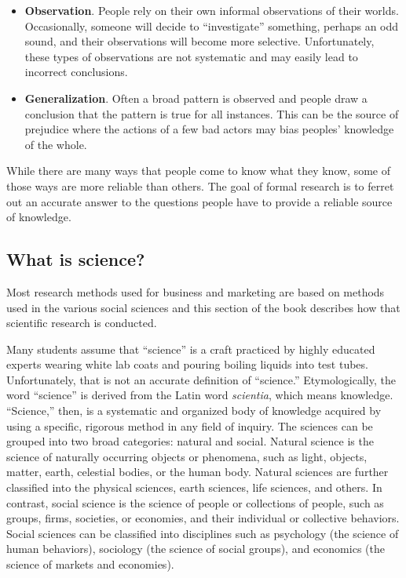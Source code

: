 \begin{itemize}
	\item \textbf{Observation}. People rely on their own informal observations of their worlds. Occasionally, someone will decide to ``investigate'' something, perhaps an odd sound, and their observations will become more selective. Unfortunately, these types of observations are not systematic and may easily lead to incorrect conclusions.
	
	\item \textbf{Generalization}. Often a broad pattern is observed and people draw a conclusion that the pattern is true for all instances. This can be the source of prejudice where the actions of a few bad actors may bias peoples' knowledge of the whole.
	
\end{itemize} 

While there are many ways that people come to know what they know, some of those ways are more reliable than others. The goal of formal research is to ferret out an accurate answer to the questions people have \textemdash \; to provide a reliable source of knowledge. 

\subsection{What is science?}

Most research methods used for business and marketing are based on methods used in the various social sciences and this section of the book describes how that scientific research is conducted.

Many students assume that ``science'' is a craft practiced by highly educated experts wearing white lab coats and pouring boiling liquids into test tubes. Unfortunately, that is not an accurate definition of ``science.'' Etymologically, the word ``science'' is derived from the Latin word \textit{scientia}, which means knowledge. ``Science,'' then, is a systematic and organized body of knowledge acquired by using a specific, rigorous method in any field of inquiry. The sciences can be grouped into two broad categories: natural and social. Natural science is the science of naturally occurring objects or phenomena, such as light, objects, matter, earth, celestial bodies, or the human body. Natural sciences are further classified into the physical sciences, earth sciences, life sciences, and others. In contrast, social science is the science of people or collections of people, such as groups, firms, societies, or economies, and their individual or collective behaviors. Social sciences can be classified into disciplines such as psychology (the science of human behaviors), sociology (the science of social groups), and economics (the science of markets and economies).

